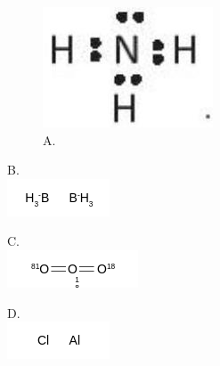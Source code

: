 \documentclass[10pt]{article}
\begin{document}
\begin{figure}[h]
\begin{center}
\captionsetup{labelformat=empty}
\caption{A.}
  \includegraphics[width=\textwidth]{2025_10_23_daab5c8457c85b365b9eg-25}
\end{center}
\end{figure}

B.\\
\includegraphics{smile-aa7a8abd3fa2e635398434bc8338ea526de69aef}

C.\\
\includegraphics{smile-64cac004bef7980918624e4cec81e76728478487}

D.\\
\includegraphics{smile-bef21e608748f21dbf05933718c9022cd676912e}
\end{document}

